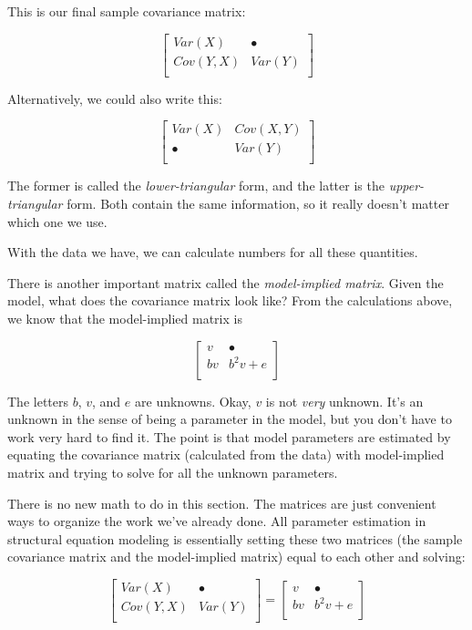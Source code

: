 \documentclass[
]{book}
\begin{document}
This is our final sample covariance matrix:

\[
\begin{bmatrix}
Var(X)       &    \bullet \\
Cov(Y, X)    &    Var(Y)    \\
\end{bmatrix}
\]

Alternatively, we could also write this:

\[
\begin{bmatrix}
Var(X)       &    Cov(X, Y) \\
\bullet      &    Var(Y)    \\
\end{bmatrix}
\]

The former is called the \emph{lower-triangular} form, and the latter is the \emph{upper-triangular} form. Both contain the same information, so it really doesn't matter which one we use.

With the data we have, we can calculate numbers for all these quantities.

There is another important matrix called the \emph{model-implied matrix}. Given the model, what does the covariance matrix look like? From the calculations above, we know that the model-implied matrix is

\[
\begin{bmatrix}
v   &    \bullet    \\
bv  &    b^{2}v + e \\
\end{bmatrix}
\]

The letters \(b\), \(v\), and \(e\) are unknowns. Okay, \(v\) is not \emph{very} unknown. It's an unknown in the sense of being a parameter in the model, but you don't have to work very hard to find it. The point is that model parameters are estimated by equating the covariance matrix (calculated from the data) with model-implied matrix and trying to solve for all the unknown parameters.

There is no new math to do in this section. The matrices are just convenient ways to organize the work we've already done. All parameter estimation in structural equation modeling is essentially setting these two matrices (the sample covariance matrix and the model-implied matrix) equal to each other and solving:

\[
\begin{bmatrix}
Var(X)       &    \bullet   \\
Cov(Y, X)    &    Var(Y)    \\
\end{bmatrix} =
\begin{bmatrix}
v       &    \bullet      \\
bv      &    b^{2}v + e        \\
\end{bmatrix}
\]
\end{document}

